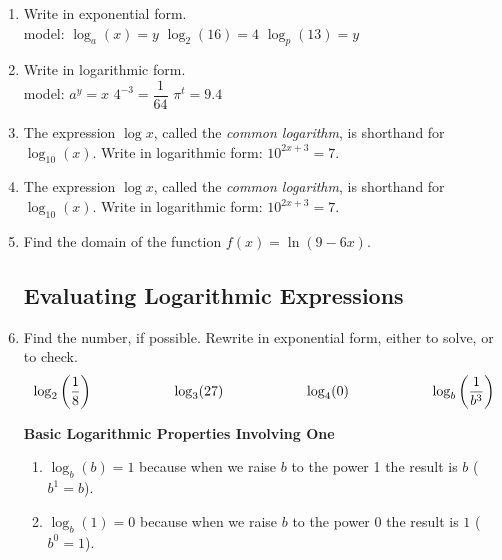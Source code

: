 \begin{enumerate}
\item Write in exponential form.  \\
model: $\log_a(x)=y$ \hspace{1in} $\log_2 (16) = 4$ \hspace{1in} $\log_p (13) = y$\\[1in]

\item Write in logarithmic form. \\
model: $a^y = x$  \hspace{1in} $4^{-3} = \dfrac{1}{64}$ \hspace{1in} $\pi^t = 9.4$ \\[.5in]


\item The expression $\log x$, called the \emph{common logarithm}, is shorthand for $\log_{10}(x)$. Write in logarithmic form: $10^{2x+3} = 7$. \\[.5in]


\item The expression $\log x$, called the \emph{common logarithm}, is shorthand for $\log_{10}(x)$. Write in logarithmic form: $10^{2x+3} = 7$. \\[.5in]

\item Find the domain of the function $f(x) = \ln (9-6x)$. \\[.8in]



\subsection{Evaluating Logarithmic Expressions}
  
\item Find the number, if possible. Rewrite in exponential form,
  either to solve, or to check.
  \begin{eqnarray*}
    \begin{array}{c@{\hspace{6em}}c@{\hspace{6em}}c@{\hspace{6em}}c}
      \log_2 \left(  \dfrac{1}{8} \right)    &
      \log_3 (27) &
      \log_4(0) &
      \log_b\left(\dfrac{1}{b^3}\right)
    \end{array}
  \end{eqnarray*}

   \noindent\colorbox{blue!10}{%
   \parbox{\dimexpr\linewidth}%
   {%
     \textbf{Basic Logarithmic Properties Involving One}
     \begin{enumerate}
     \item $\log_b(b)=1$ because when we raise $b$ to the power 1 the result is $b$ ($b^1=b$).
     \item $\log_b(1)=0$ because when we raise $b$ to the power 0 the result is $1$ ($b^0=1$).
     \end{enumerate}

}}
\end{enumerate}
